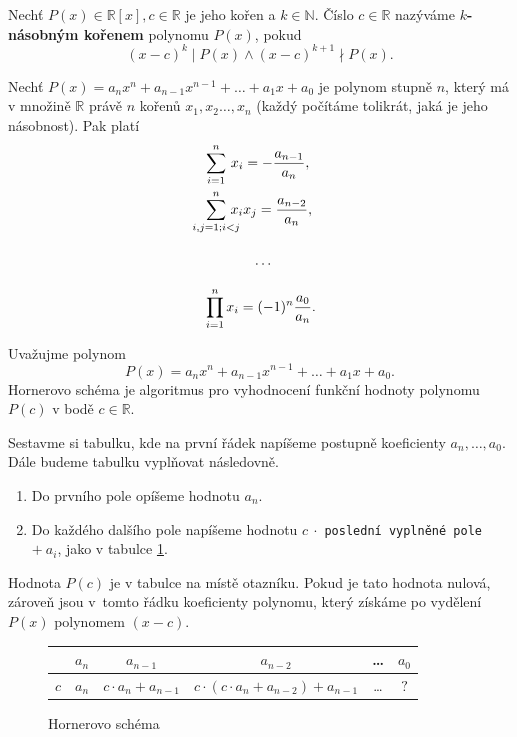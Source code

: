 \begin{definition}
  Nechť $P(x) \in \mathbb R [x], c \in \mathbb R$ je jeho kořen a $k \in \mathbb N$. Číslo $c \in \mathbb R$ nazýváme \textbf{$k$-násobným kořenem} polynomu $P(x)$, pokud
  \[
    (x-c)^k \mid P(x) \land (x-c)^{k+1} \nmid  P(x).
  \]
\end{definition}

\begin{veta}
  Nechť $P(x)=a_nx^n+a_{n-1}x^{n-1}+\dots + a_1x+a_0$ je polynom stupně $n$, který má v množině $\mathbb R$ právě $n$ kořenů $x_1,x_2\dots,x_n$ (každý počítáme tolikrát, jaká je jeho násobnost). Pak platí
  \begin{align*}
    &\smashoperator[l]{\sum_{i=1}^n} \, x_i = -\frac{a_{n-1}}{a_n}, \\
    &\smashoperator[l]{\sum_{i,j=1; i<j}^{n}}\!\!\!\!\! x_ix_j = \frac{a_{n-2}}{a_n}, \\
    &\phantom{\sum_x^d x_ix_j} \hdots\\
    &\smashoperator[l]{\prod_{i=1}^n}x_i =(-1)^n\frac{a_0}{a_n}.
  \end{align*}
\end{veta}

\begin{algoritmus}
    Uvažujme polynom
    $$
        P(x) = a_n x^n + a_{n-1} x^{n-1} + \dots + a_1 x + a_0.
    $$
    Hornerovo schéma je algoritmus pro vyhodnocení funkční hodnoty polynomu $P(c)$ v bodě $c \in \mathbb R $.
    \par Sestavme si tabulku, kde na první řádek napíšeme postupně koeficienty $a_n, \dots, a_0$. Dále budeme tabulku
    vyplňovat následovně.
    \begin{enumerate}
	\item Do prvního pole opíšeme hodnotu $a_n$.
	\item Do každého dalšího pole napíšeme hodnotu $c \ \cdot $ \texttt{poslední vyplněné pole} $ + \ a_i$,
	jako v tabulce \ref{fig:horner}.
    \end{enumerate}
    Hodnota $P(c)$ je v tabulce na místě otazníku. Pokud je tato hodnota nulová, zároveň jsou v~tomto řádku koeficienty
    polynomu, který získáme po vydělení $P(x)$ polynomem $(x-c)$.
    \begin{figure}[h]
	\centering
	\begin{tabular}{c | c c c c c}
		\, & $a_n$ & $a_{n-1}$ & $a_{n-2}$ & \dots & $a_0$ \\
			\hline
		$c$  & $a_n$ & $c\cdot a_n + a_{n-1}$ & $c\cdot (c\cdot a_n + a_{n-2}) + a_{n-1}$ & \dots & $\boxed{?}$
	\end{tabular}
	\caption{Hornerovo schéma}
	\label{fig:horner}
    \end{figure}
\end{algoritmus}

